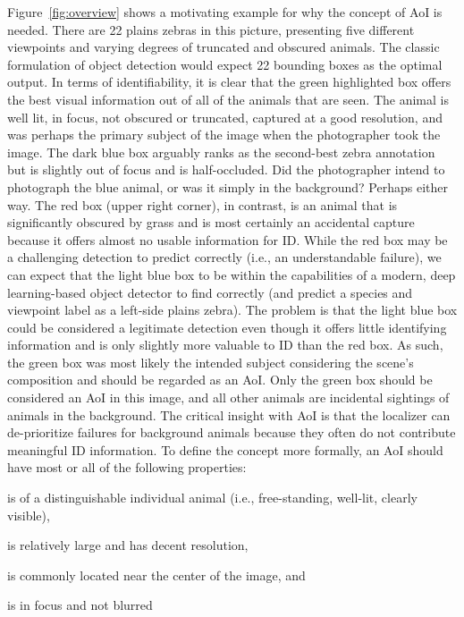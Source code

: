 Figure~\ref{fig:overview} shows a motivating example for why the concept of AoI is needed. There are 22 plains zebras in this picture, presenting five different viewpoints and varying degrees of truncated and obscured animals.  The classic formulation of object detection would expect 22 bounding boxes as the optimal output.  In terms of identifiability, it is clear that the green highlighted box offers the best visual information out of all of the animals that are seen.  The animal is well lit, in focus, not obscured or truncated, captured at a good resolution, and was perhaps the primary subject of the image when the photographer took the image.  The dark blue box arguably ranks as the second-best zebra annotation but is slightly out of focus and is half-occluded.  Did the photographer intend to photograph the blue animal, or was it simply in the background?  Perhaps either way.  The red box (upper right corner), in contrast, is an animal that is significantly obscured by grass and is most certainly an accidental capture because it offers almost no usable information for ID.  While the red box may be a challenging detection to predict correctly (i.e., an understandable failure), we can expect that the light blue box to be within the capabilities of a modern, deep learning-based object detector to find correctly (and predict a species and viewpoint label as a left-side plains zebra).  The problem is that the light blue box could be considered a legitimate detection even though it offers little identifying information and is only slightly more valuable to ID than the red box.  As such, the green box was most likely the intended subject considering the scene's composition and should be regarded as an AoI.  Only the green box should be considered an AoI in this image, and all other animals are incidental sightings of animals in the background.  The critical insight with AoI is that the localizer can de-prioritize failures for background animals because they often do not contribute meaningful ID information.  To define the concept more formally, an AoI should have most or all of the following properties:

\squishlist
\item is of a distinguishable individual animal (i.e., free-standing, well-lit, clearly visible),
\item is relatively large and has decent resolution,
\item is commonly located near the center of the image, and
\item is in focus and not blurred
\squishend

